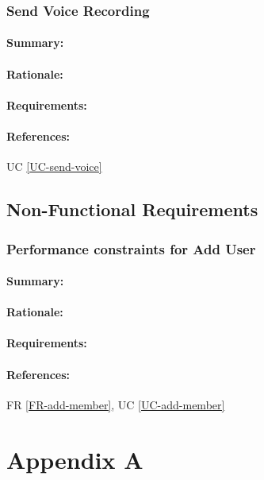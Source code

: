 \documentclass[11pt]{article}
\begin{document}
\subsubsection{Send Voice Recording} \label{FR-send-voice}
\paragraph{Summary:}
\paragraph{Rationale:}
\paragraph{Requirements:}
\paragraph{References:} UC \ref{UC-send-voice}

\subsection{Non-Functional Requirements}
\subsubsection{Performance constraints for Add User} \label{NF-performance-add-user}
\paragraph{Summary:}
\paragraph{Rationale:}
\paragraph{Requirements:}
\paragraph{References:} FR \ref{FR-add-member}, UC \ref{UC-add-member}



\newpage
\section{Appendix A} \label{appendix-a}
\listoffigures
\end{document}
